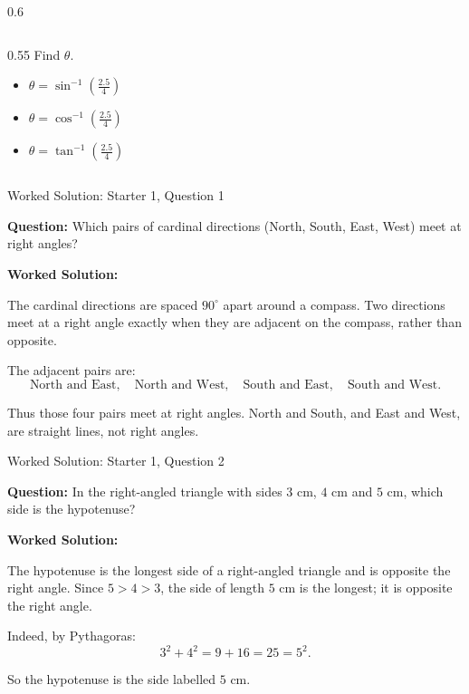 \documentclass[aspectratio=169]{beamer}
\newcommand{\ashow}[1]{\uncover<2->{\textcolor{red}{\small #1}}}
\begin{document}
\begin{frame}
\begin{columns}[t,onlytextwidth]
\begin{column}{0.6\textwidth}
\begin{columns}[t,onlytextwidth]
\begin{column}{0.55\textwidth}
    Find $\theta$.

     \fontsize{10}{12}\selectfont

    \begin{itemize}
        \item[(A)] $\displaystyle \theta = \sin^{-1}\!\left(\frac{2.5}{4}\right)$
        \item[(B)] $\displaystyle \theta = \cos^{-1}\!\left(\frac{2.5}{4}\right)$
        \item[(C)] $\displaystyle \theta = \tan^{-1}\!\left(\frac{2.5}{4}\right)$
    \end{itemize}

    \ashow{Answer: (A)}

  \end{column}
\end{columns}
\end{column}
\end{columns}

\end{frame}

\begin{frame}{Worked Solution: Starter 1, Question 1}
\hypertarget{work-st1}{}

\textbf{Question:} Which pairs of cardinal directions (North, South, East, West) meet at right angles?

\textbf{Worked Solution:}

The cardinal directions are spaced \(90^\circ\) apart around a compass. Two directions meet at a right angle exactly when they are adjacent on the compass, rather than opposite.

The adjacent pairs are:
\[
\text{North and East},\quad \text{North and West},\quad \text{South and East},\quad \text{South and West}.
\]

Thus those four pairs meet at right angles. North and South, and East and West, are straight lines, not right angles.

\end{frame}

\begin{frame}{Worked Solution: Starter 1, Question 2}

\textbf{Question:} In the right-angled triangle with sides \(3\) cm, \(4\) cm and \(5\) cm, which side is the hypotenuse?

\textbf{Worked Solution:}

The hypotenuse is the longest side of a right-angled triangle and is opposite the right angle. Since \(5 > 4 > 3\), the side of length \(5\) cm is the longest; it is opposite the right angle.

Indeed, by Pythagoras:
\[
3^2 + 4^2 = 9 + 16 = 25 = 5^2.
\]

So the hypotenuse is the side labelled \(5\) cm.

\end{frame}
\end{document}
